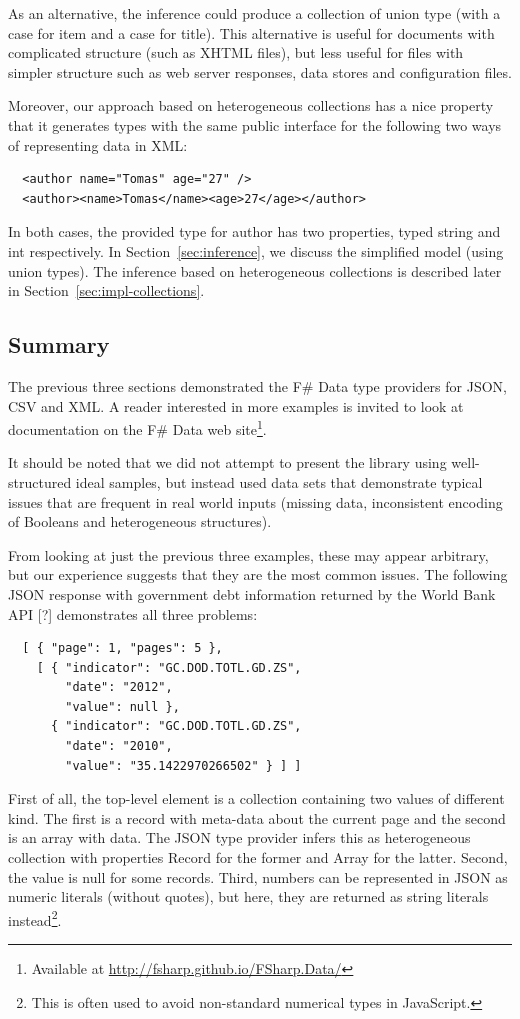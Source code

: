 \documentclass[preprint]{sigplanconf}
\newcommand{\kvd}[1]{\textnormal{\textcolor{kvdclr}{\sffamily #1}}}
\newcommand{\ident}[1]{\textnormal{\sffamily #1}}
\begin{document}
As an alternative, the inference could produce a collection of union type (with a case for \ident{item}
and a case for \ident{title}). This alternative is useful for documents with complicated structure 
(such as XHTML files), but less useful for files with simpler structure such as web server responses,
data stores and configuration files. 

Moreover, our approach based on heterogeneous collections has a nice property that it generates types
with the same public interface for the following two ways of representing data in XML:
%
{\small{
\begin{verbatim}
  <author name="Tomas" age="27" />
  <author><name>Tomas</name><age>27</age></author>
\end{verbatim}
}}
%
\noindent
In both cases, the provided type for \ident{author} has two properties, typed \ident{string} and 
\ident{int} respectively. In Section~\ref{sec:inference}, we discuss the simplified model (using 
union types). The inference based on heterogeneous collections is described later in 
Section~\ref{sec:impl-collections}.


\subsection{Summary}
The previous three sections demonstrated the F\# Data type providers for JSON, CSV and XML.
A reader interested in more examples is invited to look at documentation on the F\# Data web 
site\footnote{Available at \url{http://fsharp.github.io/FSharp.Data/}}.

It should be noted that we did not attempt to present the library using well-structured ideal 
samples, but instead used data sets that demonstrate typical issues that are frequent in real 
world inputs (missing data, inconsistent encoding of Booleans and heterogeneous structures).

From looking at just the previous three examples, these may appear arbitrary, but our experience
suggests that they are the most common issues. The following JSON response with government debt
information returned by the World Bank API [?] demonstrates all three problems:
%
{\small{
\begin{verbatim}
  [ { "page": 1, "pages": 5 },
    [ { "indicator": "GC.DOD.TOTL.GD.ZS",
        "date": "2012",
        "value": null },
      { "indicator": "GC.DOD.TOTL.GD.ZS",
        "date": "2010",
        "value": "35.1422970266502" } ] ]
\end{verbatim}
}}
%
\noindent
First of all, the top-level element is a collection containing two values of different kind.
The first is a record with meta-data about the current page and the second is an array with data. 
The JSON type provider infers this as heterogeneous collection with properties \ident{Record}
for the former and \ident{Array} for the latter. Second, the \ident{value} is \kvd{null} for some
records. Third, numbers can be represented in JSON as numeric literals (without quotes), but
here, they are returned as string literals instead\footnote{This is often used to avoid non-standard
numerical types in JavaScript.}.
\end{document}

